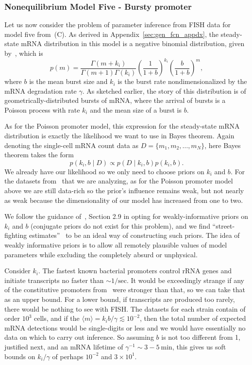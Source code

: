 \subsubsection{Nonequilibrium Model Five - Bursty promoter}
Let us now consider the problem of parameter inference from FISH data
for model five from~(C). As derived
in Appendix~\ref{sec:gen_fcn_appdx}, the steady-state mRNA distribution
in this model is a negative binomial distribution,
given by~, which is
\begin{equation}
p(m) = \frac{\Gamma(m+k_i)}{\Gamma(m+1)\Gamma(k_i)}
        \left(\frac{1}{1+b}\right)^{k_i}
        \left(\frac{b}{1+b}\right)^m,
\end{equation}
where $b$ is the mean burst size and $k_i$ is the burst rate
nondimensionalized by the mRNA degradation rate $\gamma$.
As sketched earlier, the story of this distribution is of
geometrically-distributed bursts of mRNA, where the arrival of bursts is a
Poisson process with rate $k_i$ and the mean size of a burst is $b$.

As for the Poisson promoter model, this expression for the steady-state
mRNA distribution is exactly the likelihood we want to use in Bayes theorem.
Again denoting the single-cell mRNA count data as $D=\{m_1, m_2,\dots, m_N\}$,
here Bayes theorem takes the form
\begin{equation}
p(k_i, b \mid D) \propto p(D\mid k_i,b)p(k_i, b).
\end{equation}
We already have our likelihood so we only need to choose priors
on $k_i$ and $b$. For the datasets from~\cite{Jones2014} that we
are analyzing, as for the Poisson promoter model above we are
still data-rich so the prior's influence remains weak, but not
nearly as weak because the dimensionality of our model has
increased from one to two.

We follow the guidance of~\cite{Gelman2013}, Section 2.9 in
opting for weakly-informative priors on $k_i$ and $b$ (conjugate
priors do not exist for this problem), and we find
``street-fighting estimates''~\cite{Mahajan2010} to be an ideal
way of constructing such priors. The idea of weakly informative
priors is to allow all remotely plausible values of model
parameters while excluding the completely absurd or unphysical.

Consider $k_i$. The fastest known bacterial promoters control
rRNA genes and initiate transcripts no faster than $\sim
1/\text{sec}$. It would be exceedingly strange if any of the
constitutive promoters from~\cite{Jones2014} were stronger than
that, so we can take that as an upper bound. For a lower bound,
if transcripts are produced too rarely, there would be nothing to
see with FISH. The datasets for each strain contain of order
$10^3$ cells, and if the $\langle m \rangle = k_i b/\gamma
\lesssim 10^{-2}$, then the total number of expected mRNA
detections would be single-digits or less and we would have
essentially no data on which to carry out inference. So assuming
$b$ is not too different from 1, justified next, and an mRNA
lifetime of $\gamma^{-1}\sim 3-5~\text{min}$, this gives us soft
bounds on $k_i/\gamma$ of perhaps $10^{-2}$ and $3\times 10^1$.

